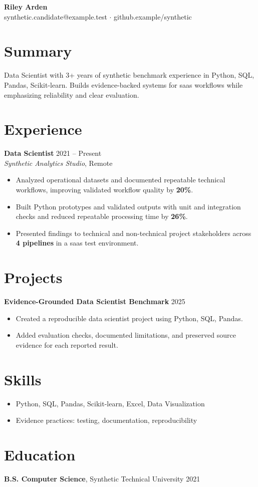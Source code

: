 \documentclass[10pt,letterpaper]{article}
\begin{document}
\begin{center}
{\Large \textbf{Riley Arden}}\\
synthetic.candidate@example.test $\cdot$ github.example/synthetic
\end{center}

\section*{Summary}
Data Scientist with 3+ years of synthetic benchmark experience in Python, SQL, Pandas, Scikit-learn. Builds evidence-backed systems for saas workflows while emphasizing reliability and clear evaluation.

\section*{Experience}
\textbf{Data Scientist} \hfill 2021 -- Present\\
\textit{Synthetic Analytics Studio}, Remote
\begin{itemize}
  \item Analyzed operational datasets and documented repeatable technical workflows, improving validated workflow quality by \textbf{20\%}.
  \item Built Python prototypes and validated outputs with unit and integration checks and reduced repeatable processing time by \textbf{26\%}.
  \item Presented findings to technical and non-technical project stakeholders across \textbf{4 pipelines} in a saas test environment.
\end{itemize}

\section*{Projects}
\textbf{Evidence-Grounded Data Scientist Benchmark} \hfill 2025
\begin{itemize}
  \item Created a reproducible data scientist project using Python, SQL, Pandas.
  \item Added evaluation checks, documented limitations, and preserved source evidence for each reported result.
\end{itemize}

\section*{Skills}
\begin{itemize}
  \item Python, SQL, Pandas, Scikit-learn, Excel, Data Visualization
  \item Evidence practices: testing, documentation, reproducibility
\end{itemize}

\section*{Education}
\textbf{B.S. Computer Science}, Synthetic Technical University \hfill 2021
\end{document}
